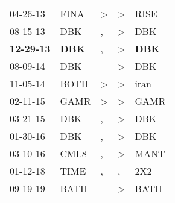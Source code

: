 \begin{supertabular}{p{0.07\textwidth}p{0.06\textwidth}p{0.02\textwidth}p{0.02\textwidth}p{0.06\textwidth}}
          04-26-13\textsuperscript{} &          FINA\textsuperscript{} &  \textgreater &  \textgreater &          RISE\textsuperscript{} \\
          08-15-13\textsuperscript{} &           DBK\textsuperscript{} &             , &  \textgreater &           DBK\textsuperscript{} \\
 \textbf{12-29-13\textsuperscript{}} &  \textbf{DBK\textsuperscript{}} &             , &  \textgreater &  \textbf{DBK\textsuperscript{}} \\
          08-09-14\textsuperscript{} &           DBK\textsuperscript{} &               &  \textgreater &           DBK\textsuperscript{} \\
          11-05-14\textsuperscript{} &          BOTH\textsuperscript{} &  \textgreater &  \textgreater &          iran\textsuperscript{} \\
          02-11-15\textsuperscript{} &          GAMR\textsuperscript{} &  \textgreater &  \textgreater &          GAMR\textsuperscript{} \\
          03-21-15\textsuperscript{} &           DBK\textsuperscript{} &             , &  \textgreater &           DBK\textsuperscript{} \\
          01-30-16\textsuperscript{} &           DBK\textsuperscript{} &             , &  \textgreater &           DBK\textsuperscript{} \\
          03-10-16\textsuperscript{} &          CML8\textsuperscript{} &             , &  \textgreater &          MANT\textsuperscript{} \\
          01-12-18\textsuperscript{} &          TIME\textsuperscript{} &             , &             , &           2X2\textsuperscript{} \\
          09-19-19\textsuperscript{} &          BATH\textsuperscript{} &               &  \textgreater &          BATH\textsuperscript{} \\
\end{supertabular}
